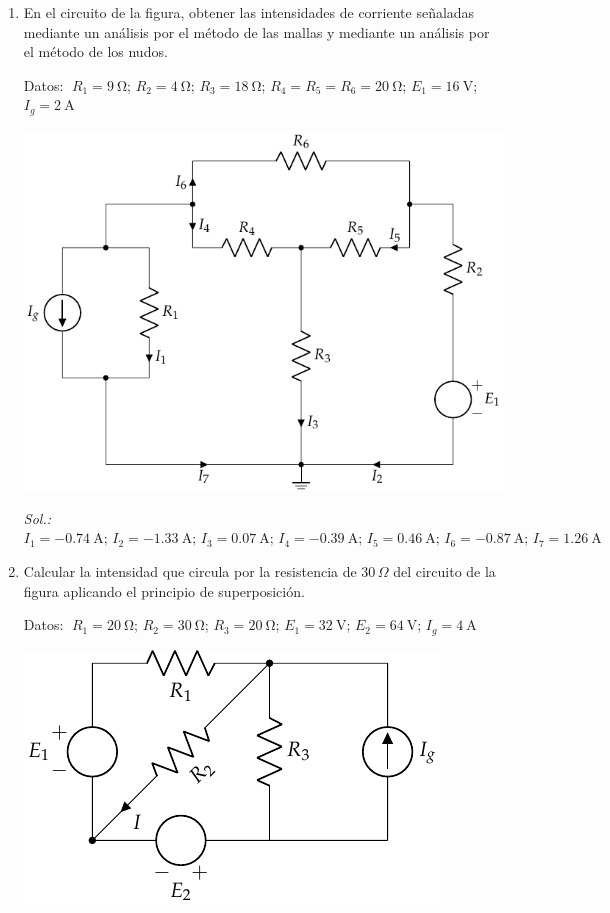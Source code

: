 \begin{enumerate}
\item En el circuito de la figura, obtener las
  intensidades de corriente señaladas mediante un análisis por el
  método de las mallas y mediante un análisis por el método de los
  nudos.

  Datos: $\; R_1 = \qty{9}{\ohm}$; $R_2 = \qty{4}{\ohm}$; $R_3 = \qty{18}{\ohm}$; $R_4 = R_5 = R_6 = \qty{20}{\ohm}$; $E_1 = \qty{16}{\volt}$; $I_g = \qty{2}{\ampere}$
  
  \begin{center}
    \includegraphics{../figs/ej12_BT1.pdf}
  \end{center}

  \emph{Sol.:\;
    $I_1=\qty{-0.74}{\ampere};\,I_2=\qty{-1.33}{\ampere};\,I_3=\qty{0.07}{\ampere};\,I_4=\qty{-0.39}{\ampere};\,I_5=\qty{0.46}{\ampere};\,I_6=\qty{-0.87}{\ampere};\,I_7=\qty{1.26}{\ampere}$}

\item Calcular la intensidad que circula por la resistencia de 30$\,\Omega$ del circuito de la figura aplicando el principio de
  superposición.

  Datos: $\; R_1 = \qty{20}{\ohm}$; $R_2 = \qty{30}{\ohm}$; $R_3 = \qty{20}{\ohm}$; $E_1 = \qty{32}{\volt}$; $E_2 = \qty{64}{\volt}$; $I_g = \qty{4}{\ampere}$
  
  \begin{center}
    \includegraphics{../figs/ej16_BT1.pdf}
  \end{center}
  

\end{enumerate}
